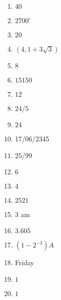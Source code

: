 \documentclass[a4paper,12pt]{exam}
\begin{document}
\pagebreak
\begin{enumerate}
\item \(40\)
\item \(2700^\circ\)
\item \(20\)
\item \((4,1+3\sqrt3)\)
\item \(8\)
\item \(15150\)
\item \(12\)
\item \(24/5\)
\item \(24\)
\item 17/06/2345
\item \(25/99\)
\item \(6\)
\item \(4\)
\item \(2521\)
\item \(3\) am
\item \(3.605\)
\item \((1-2^{-3})A\)
\item Friday
\item \(1\)
\item \(1\)
\end{enumerate}
\end{document}
